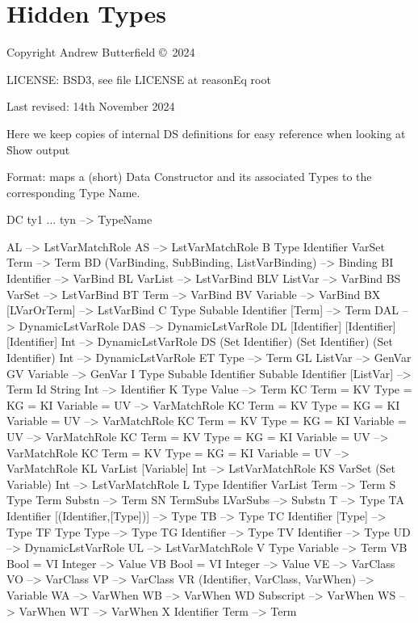 \chapter{Hidden Types}

Copyright  Andrew Butterfield \copyright\ 2024

LICENSE: BSD3, see file LICENSE at reasonEq root

Last revised: 14th November 2024

Here we keep copies of internal DS definitions
for easy reference when looking at \h{Show} output
\newpage

Format: maps a (short) Data Constructor and its associated Types to the corresponding Type Name.
\begin{code}
DC ty1 ... tyn -->  TypeName
\end{code}


\begin{code}
AL  -->  LstVarMatchRole
AS  -->  LstVarMatchRole
B Type Identifier VarSet Term  -->  Term
BD (VarBinding, SubBinding, ListVarBinding)  -->  Binding
BI Identifier  -->  VarBind
BL  VarList  -->  LstVarBind
BLV ListVar   -->  VarBind
BS  VarSet  -->  LstVarBind
BT Term  -->  VarBind
BV Variable   -->  VarBind
BX  [LVarOrTerm]   -->  LstVarBind
C Type Subable Identifier [Term]  -->  Term
DAL  -->  DynamicLstVarRole
DAS  -->  DynamicLstVarRole
DL [Identifier] [Identifier] [Identifier] Int  -->  DynamicLstVarRole
DS (Set Identifier) (Set Identifier) (Set Identifier) Int --> DynamicLstVarRole
ET Type   -->  Term
GL ListVar   -->  GenVar
GV Variable -->  GenVar
I Type Subable Identifier Subable Identifier [ListVar]  -->  Term
Id String Int  --> Identifier
K Type Value  -->  Term
KC Term = KV Type = KG = KI Variable = UV   -->  VarMatchRole
KC Term = KV Type = KG = KI Variable = UV   -->  VarMatchRole
KC Term = KV Type = KG = KI Variable = UV   -->  VarMatchRole
KC Term = KV Type = KG = KI Variable = UV   -->  VarMatchRole
KC Term = KV Type = KG = KI Variable = UV   -->  VarMatchRole
KL VarList [Variable] Int  -->  LstVarMatchRole
KS VarSet (Set Variable) Int  -->  LstVarMatchRole
L Type Identifier VarList Term  -->  Term
S Type Term Substn -->  Term
SN TermSubs LVarSubs   -->  Substn
T  -->  Type
TA Identifier [(Identifier,[Type])]  -->  Type
TB   -->  Type
TC Identifier [Type]  -->  Type
TF Type Type  -->  Type
TG Identifier -->  Type
TV Identifier  -->  Type
UD   -->  DynamicLstVarRole
UL   -->  LstVarMatchRole
V Type Variable  -->  Term
VB Bool = VI Integer   -->  Value
VB Bool = VI Integer   -->  Value
VE  -->  VarClass
VO  -->  VarClass
VP   -->  VarClass
VR (Identifier, VarClass, VarWhen)  -->  Variable
WA  -->  VarWhen
WB  -->  VarWhen
WD Subscript  -->  VarWhen
WS  -->  VarWhen
WT   -->  VarWhen
X Identifier Term  -->  Term
\end{code}
